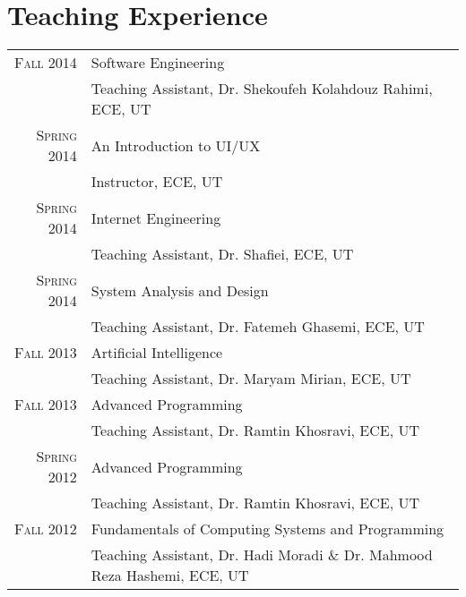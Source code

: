 \documentclass[a4paper,10pt]{article}
\begin{document}
\section{Teaching Experience}
\begin{tabular}{rl}
 \textsc{Fall} 2014 & Software Engineering \\ &
 \footnotesize{Teaching Assistant, Dr. Shekoufeh Kolahdouz Rahimi, ECE, UT}\\
\textsc{Spring} 2014 & An Introduction to UI/UX \\ &
\footnotesize{Instructor, ECE, UT}\\
\textsc{Spring} 2014 & Internet Engineering \\ &
\footnotesize{Teaching Assistant, Dr. Shafiei, ECE, UT}\\
\textsc{Spring} 2014 & System Analysis and Design \\ &
\footnotesize{Teaching Assistant, Dr. Fatemeh Ghasemi, ECE, UT}\\
\textsc{Fall} 2013 & Artificial Intelligence \\ &
\footnotesize{Teaching Assistant, Dr. Maryam Mirian, ECE, UT}\\
\textsc{Fall} 2013 & Advanced Programming \\ &
\footnotesize{Teaching Assistant, Dr. Ramtin Khosravi, ECE, UT}\\
\textsc{Spring} 2012 & Advanced Programming \\ &
\footnotesize{Teaching Assistant, Dr. Ramtin Khosravi, ECE, UT}\\
\textsc{Fall} 2012 & Fundamentals of Computing Systems and Programming \\ &
\footnotesize{Teaching Assistant, Dr. Hadi Moradi \& Dr. Mahmood Reza Hashemi, ECE, UT}
\end{tabular}

\end{document}
